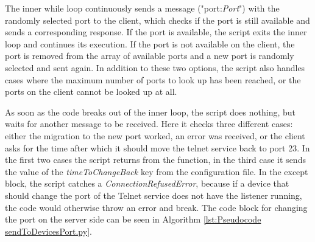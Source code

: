 The inner while loop continuously sends a message ("port:\textit{Port}") with the randomly selected port to the client, which checks if the port is still available and sends a corresponding response. If the port is available, the script exits the inner loop and continues its execution. If the port is not available on the client, the port is removed from the array of available ports and a new port is randomly selected and sent again. In addition to these two options, the script also handles cases where the maximum number of ports to look up has been reached, or the ports on the client cannot be looked up at all. 

As soon as the code breaks out of the inner loop, the script does nothing, but waits for another message to be received. Here it checks three different cases: either the migration to the new port worked, an error was received, or the client asks for the time after which it should move the telnet service back to port 23. In the first two cases the script returns from the function, in the third case it sends the value of the \textit{timeToChangeBack} key from the configuration file. In the except block, the script catches a \textit{ConnectionRefusedError}, because if a device that should change the port of the Telnet service does not have the listener running, the code would otherwise throw an error and break. The code block for changing the port on the server side can be seen in Algorithm \ref{lst:Pseudocode sendToDevicesPort.py}.
\\

